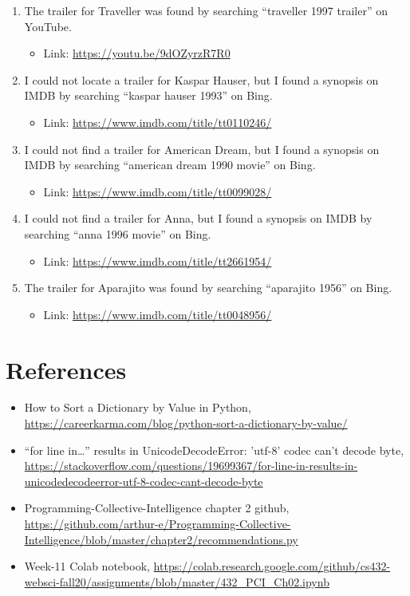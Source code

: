 \documentclass[12pt]{article}
\begin{document}
\begin{enumerate}
\begin{itemize}
    \end{itemize}
    \item The trailer for Traveller was found by searching ``traveller 1997 trailer'' on YouTube.
    \begin{itemize}
        \item Link: \url{https://youtu.be/9dOZyrzR7R0}
    \end{itemize}
    \item I could not locate a trailer for Kaspar Hauser, but I found a synopsis on IMDB by searching ``kaspar hauser 1993'' on Bing.
    \begin{itemize}
        \item Link: \url{https://www.imdb.com/title/tt0110246/}
    \end{itemize}
    \item I could not find a trailer for American Dream, but I found a synopsis on IMDB by searching ``american dream 1990 movie'' on Bing.
    \begin{itemize}
        \item Link: \url{https://www.imdb.com/title/tt0099028/}
    \end{itemize}
    \item I could not find a trailer for Anna, but I found a synopsis on IMDB by searching ``anna 1996 movie'' on Bing.
    \begin{itemize}
        \item Link: \url{https://www.imdb.com/title/tt2661954/}
    \end{itemize}
    \item The trailer for Aparajito was found by searching ``aparajito 1956'' on Bing.
    \begin{itemize}
        \item Link: \url{https://www.imdb.com/title/tt0048956/}
    \end{itemize}
\end{enumerate}

\section*{References}


\begin{itemize}
    \item {How to Sort a Dictionary by Value in Python, \url{https://careerkarma.com/blog/python-sort-a-dictionary-by-value/}}
    \item {“for line in…” results in UnicodeDecodeError: 'utf-8' codec can't decode byte, \url{https://stackoverflow.com/questions/19699367/for-line-in-results-in-unicodedecodeerror-utf-8-codec-cant-decode-byte}}
    \item {Programming-Collective-Intelligence chapter 2 github, \url{https://github.com/arthur-e/Programming-Collective-Intelligence/blob/master/chapter2/recommendations.py}}
    \item {Week-11 Colab notebook, \url{https://colab.research.google.com/github/cs432-websci-fall20/assignments/blob/master/432_PCI_Ch02.ipynb}}
\end{itemize}
\end{document}
